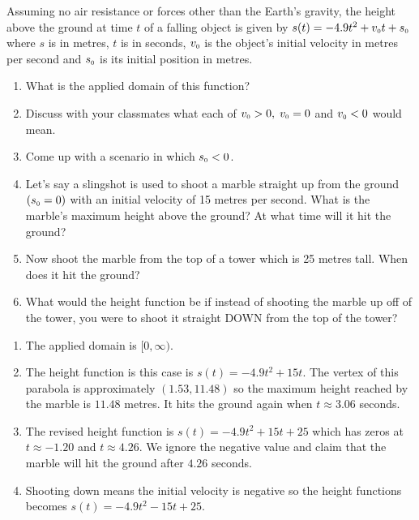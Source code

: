 {Assuming no air resistance or forces other than the Earth's gravity, the height above the ground at time $t$ of a falling object is given by $s(t) = -4.9t^{2} + v_{\mbox{\tiny $0$}}t + s_{\mbox{\tiny $0$}}$ where $s$ is in metres, $t$ is in seconds, $v_{\mbox{\tiny $0$}}$ is the object's initial velocity in metres per second and $s_{\mbox{\tiny $0$}}$ is its initial position in metres.  
\label{whatgoesup}

\begin{enumerate}

\item What is the applied domain of this function?
\item Discuss with your classmates what each of $v_{\mbox{\tiny $0$}} > 0, \; v_{\mbox{\tiny $0$}} = 0$ and $v_{\mbox{\tiny $0$}} < 0$ would mean.
\item Come up with a scenario in which $s_{\mbox{\tiny $0$}} < 0$.
\item Let's say a slingshot is used to shoot a marble straight up from the ground $(s_{\mbox{\tiny $0$}} = 0)$ with an initial velocity of 15 metres per second.  What is the marble's maximum height above the ground?  At what time will it hit the ground?
\item Now shoot the marble from the top of a tower which is 25 metres tall.  When does it hit the ground?
\item What would the height function be if instead of shooting the marble up off of the tower, you were to shoot it straight DOWN from the top of the tower?

\end{enumerate}}
{\begin{enumerate}

\item The applied domain is $[0, \infty)$.

\addtocounter{enumii}{2}

\item The height function is this case is $s(t) = -4.9t^{2} + 15t$.  The vertex of this parabola is approximately $(1.53, 11.48)$ so the maximum height reached by the marble is $11.48$ metres.  It hits the ground again when $t \approx 3.06$ seconds.

\item The revised height function is $s(t) = -4.9t^{2} + 15t + 25$ which has zeros at $t \approx -1.20$ and $t \approx 4.26$.  We ignore the negative value and claim that the marble will hit the ground after $4.26$ seconds.

\item Shooting down means the initial velocity is negative so the height functions becomes $s(t) = -4.9t^{2} - 15t + 25$.

\end{enumerate}}